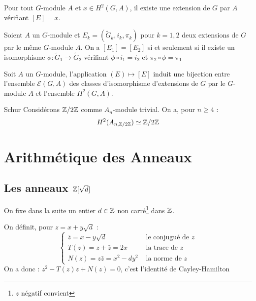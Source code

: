 \documentclass{cours}
\begin{document}
\begin{propositionfr}{}{}
    Pour tout $G$-module $A$ et $x \in H^{2}(G, A)$, il existe une extension de $G$ par $A$ vérifiant $\left[E\right] = x$.
\end{propositionfr}
\begin{propositionfr}{}{}
    Soient $A$ un $G$-module et $E_{k} = \left(\tilde{G}_{k}, i_{k}, \pi_{k}\right)$ pour $k = 1, 2$ deux extensions de $G$ par le même $G$-module $A$. On a $\left[E_{1}\right] = \left[E_{2}\right]$ si et seulement si il existe un isomorphisme $\phi : \tilde{G}_{1} \rightarrow \tilde{G}_{2}$ vérifiant $\phi \circ i_{1} = i_{2}$ et $\pi_{2} \circ \phi = \pi_{1}$
\end{propositionfr}
\begin{corollaire}{}{}
    Soit $A$ un $G$-module, l'application $(E) \mapsto \left[E\right]$ induit une bijection entre l'ensemble $\mathcal{E}(G, A)$ des classes d'isomorphisme d'extensions de $G$ par le $G$-module $A$ et l'ensemble $H^{2}(G, A)$.
\end{corollaire}

\begin{théorème}{Schur}{}
    Considérons $\mathbb{Z}/2\mathbb{Z}$ comme $A_{n}$-module trivial. On a, pour $n \geq 4$ :
    \[
        H^{2}(A_{n, \mathbb{Z}/2\mathbb{Z}}) \simeq \mathbb{Z}/2\mathbb{Z}
    \]
\end{théorème}

\section{Arithmétique des Anneaux}
\subsection{Les anneaux $\mathbb{Z}[\sqrt{d}]$}
On fixe dans la suite un entier $d \in \mathbb{Z}$ non carré\footnote{$z$ négatif convient} dans $\mathbb{Z}$.

\begin{définition}{}{}
    On définit, pour $z = x + y\sqrt{d}$ :
    \[
        \begin{cases}
            \bar{z} = x - y\sqrt{d}          & \text{ le conjugué de } z \\
            T(z) = z + \bar{z} = 2x          & \text{ la trace de } z    \\
            N(z) = z\bar{z} = x^{2} - dy^{2} & \text{ la norme de } z
        \end{cases}
    \]
    On a donc : $z^{2} - T(z)z + N(z) = 0$, c'est l'identité de Cayley-Hamilton
\end{définition}
\end{document}
